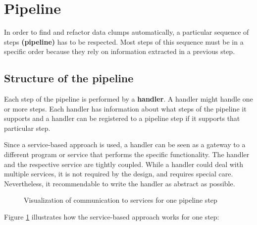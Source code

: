 

\section{Pipeline}\label{sec:pipeline}
In order to find and refactor data clumps automatically, a particular sequence of steps \textbf{(pipeline)} has to be respected. Most steps of this sequence must be in a specific order because they rely on information extracted in a previous step.

\subsection{Structure of the pipeline}
Each step of the pipeline is performed by a  \textbf{handler}. A handler might handle one or more steps.  Each handler has information about what steps of the pipeline it supports and  a handler can be registered to a pipeline step if it supports that particular step.  

Since a service-based approach is used, a handler can be seen as a gateway to a different program or service that performs the specific functionality.  The handler and the respective service are tightly coupled. While a handler could deal with multiple services, it is not required by the design, and requires special care. Nevertheless, it recommendable to write the handler as abstract as possible.
\begin{figure}
    \centering
    
    \caption{Visualization of communication to services for one pipeline step}
    \label{fig:solver_gateway_service_overview}
\end{figure}

Figure \ref{fig:solver_gateway_service_overview} illustrates how the service-based approach works for one step:

